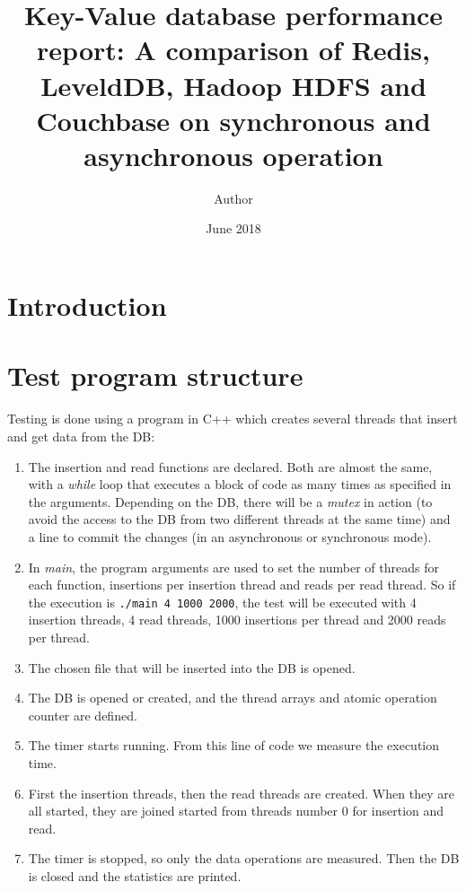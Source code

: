 \documentclass[11pt]{article}
\title{Key-Value database performance report: A comparison of Redis, LeveldDB, Hadoop HDFS and Couchbase on synchronous and asynchronous operation}
\author{Author}
\date{June 2018}
\begin{document}
\maketitle
\thispagestyle{empty}

\newpage
\tableofcontents

\newpage
\section{Introduction}

\section{Test program structure}

Testing is done using a program in C++ which creates several threads that insert and get data from the DB:

\begin{enumerate}
    \item The insertion and read functions are declared. Both are almost the same, with a \textit{while} loop that executes a block of code as many times as specified in the arguments. Depending on the DB, there will be a \textit{mutex} in action (to avoid the access to the DB from two different threads at the same time) and a line to commit the changes (in an asynchronous or synchronous mode).
    \item In \textit{main}, the program arguments are used to set the number of threads for each function, insertions per insertion thread and reads per read thread. So if the execution is \texttt{./main 4 1000 2000}, the test will be executed with 4 insertion threads, 4 read threads, 1000 insertions per thread and 2000 reads per thread.
    \item The chosen file that will be inserted into the DB is opened.
    \item The DB is opened or created, and the thread arrays and atomic operation counter are defined.
    \item The timer starts running. From this line of code we measure the execution time.
    \item First the insertion threads, then the read threads are created. When they are all started, they are joined started from threads number 0 for insertion and read.
    \item The timer is stopped, so only the data operations are measured. Then the DB is closed and the statistics are printed.
\end{enumerate}
\end{document}
